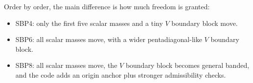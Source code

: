 \documentclass[
  aps,
  pre,
  reprint,
  superscriptaddress,
  nofootinbib
]{revtex4-2}
\begin{document}
Order by order, the main difference is how much freedom is granted:
\begin{itemize}
  \item SBP4: only the first five scalar masses and a tiny $V$ boundary block move.
  \item SBP6: all scalar masses move, with a wider pentadiagonal-like $V$ boundary block.
  \item SBP8: all scalar masses move, the $V$ boundary block becomes general banded, and
  the code adds an origin anchor plus stronger admissibility checks.
\end{itemize}
\end{document}
